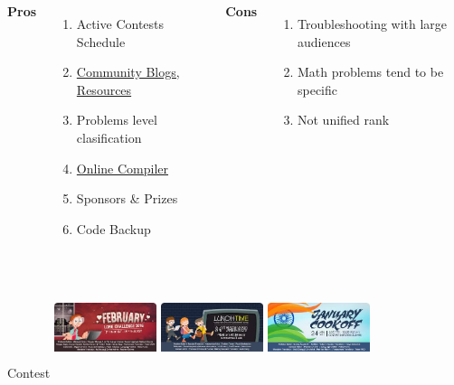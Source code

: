 \documentclass{beamer}
\begin{document}
\begin{frame}
	\begin{columns}[c] %
		\textbf{Pros}
		\begin{enumerate}
			\item Active Contests Schedule  
			\item \href{https://blog.codechef.com/}{Community Blogs, Resources}
			\item Problems level clasification
			\item \href{https://www.codechef.com/ide}{Online Compiler}
			\item Sponsors \& Prizes
			\item Code Backup
		\end{enumerate}
		\textbf{Cons}
		\begin{enumerate}
			\item Troubleshooting with large audiences
			\item Math problems tend to be specific
			\item Not unified rank
		\end{enumerate}
	\end{columns}
	\begin{block}{Contest}
	\center
	\href{https://www.codechef.com/JAN16} {\includegraphics[width=3cm,height=3cm,keepaspectratio]{images/contests/long_challenge}}
	\href{https://www.codechef.com/LTIME32}	{\includegraphics[width=3cm,height=3cm,keepaspectratio]{images/contests/lunch_time}}
	\href{https://www.codechef.com/COOK66}{\includegraphics[width=3cm,height=3cm,keepaspectratio]{images/contests/cook_off}}
	\end{block}

\end{frame}
\end{document}
